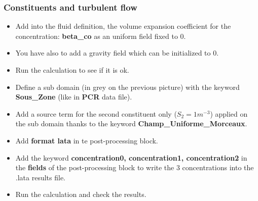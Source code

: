 \documentclass[10pt]{beamer}
\begin{document}
\begin{frame}
\frametitle{Constituents and turbulent flow}
\begin{block}{}

\begin{itemize}
\item Add into the fluid definition, the volume expansion coefficient for the concentration: \textbf{beta\_co} as an uniform field fixed to 0.

\item You have also to add a gravity field which can be initialized to 0.

\item Run the calculation to see if it is ok.

\item Define a sub domain (in grey on the previous picture) with the keyword \textbf{Sous\_Zone} (like in \textbf{PCR} data file).

\item Add a source term for the second constituent only ($S_2=1m^{-3}$) applied on the sub domain thanks to the keyword \textbf{Champ\_Uniforme\_Morceaux}.

\item Add \textbf{format lata} in te post-processing block.

\item Add the keyword \textbf{concentration0, concentration1, concentration2} in the \textbf{fields} of the post-processing block to write the 3 concentrations into the .lata results file.

\item Run the calculation and check the results.
\end{itemize}

\end{block}
\end{frame}
\end{document}
